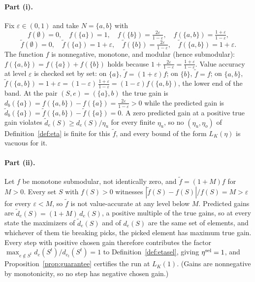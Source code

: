 \paragraph{Part (i).}
Fix $\varepsilon\in(0,1)$ and take $N=\{a,b\}$ with
\[
  f(\emptyset)=0,\quad f(\{a\})=1,\quad
  f(\{b\})=\tfrac{2\varepsilon}{1-\varepsilon},\quad
  f(\{a,b\})=\tfrac{1+\varepsilon}{1-\varepsilon},
\]
\[
  \tilde f(\emptyset)=0,\quad \tilde f(\{a\})=1+\varepsilon,\quad
  \tilde f(\{b\})=\tfrac{2\varepsilon}{1-\varepsilon},\quad
  \tilde f(\{a,b\})=1+\varepsilon .
\]
The function $f$ is nonnegative, monotone, and modular (hence submodular):
$f(\{a,b\})=f(\{a\})+f(\{b\})$ holds because
$1+\tfrac{2\varepsilon}{1-\varepsilon}=\tfrac{1+\varepsilon}{1-\varepsilon}$.
Value accuracy at level $\varepsilon$ is checked set by set: on $\{a\}$,
$\tilde f=(1+\varepsilon)f$; on $\{b\}$, $\tilde f=f$; on $\{a,b\}$,
$\tilde f(\{a,b\})=1+\varepsilon=(1-\varepsilon)\,
\tfrac{1+\varepsilon}{1-\varepsilon}=(1-\varepsilon)f(\{a,b\})$, the lower
end of the band.  At the pair $(S,e)=(\{a\},b)$ the true gain is
$d_b(\{a\})=f(\{a,b\})-f(\{a\})=\tfrac{2\varepsilon}{1-\varepsilon}>0$
while the predicted gain is
$\tilde d_b(\{a\})=\tilde f(\{a,b\})-\tilde f(\{a\})=0$.  A zero predicted
gain at a positive true gain violates
$\tilde d_e(S)\ge d_e(S)/\eta_u$ for every finite $\eta_u$, so no
$(\eta_u,\eta_o)$ of Definition~\ref{def:eta} is finite for this
$\tilde f$, and every bound of the form $L_K(\eta)$ is vacuous for it.

\paragraph{Part (ii).}
Let $f$ be monotone submodular, not identically zero, and
$\tilde f=(1+M)f$ for $M>0$.  Every set $S$ with $f(S)>0$ witnesses
$|\tilde f(S)-f(S)|/f(S)=M>\varepsilon$ for every $\varepsilon<M$, so
$\tilde f$ is not value-accurate at any level below $M$.  Predicted gains
are $\tilde d_e(S)=(1+M)\,d_e(S)$, a positive multiple of the true gains,
so at every state the maximizers of $\tilde d_e(S)$ and of $d_e(S)$ are
the same set of elements, and whichever of them tie breaking picks, the
picked element has maximum true gain.  Every step with positive chosen
gain therefore contributes the factor
$\max_{e\notin S^t}d_e(S^t)/d_{e_t}(S^t)=1$ to
Definition~\ref{def:etasel}, giving $\eta^{\mathrm{sel}}=1$, and
Proposition~\ref{prop:guarantee} certifies the run at $L_K(1)$.
(Gains are nonnegative by monotonicity, so no step has negative chosen
gain.)

